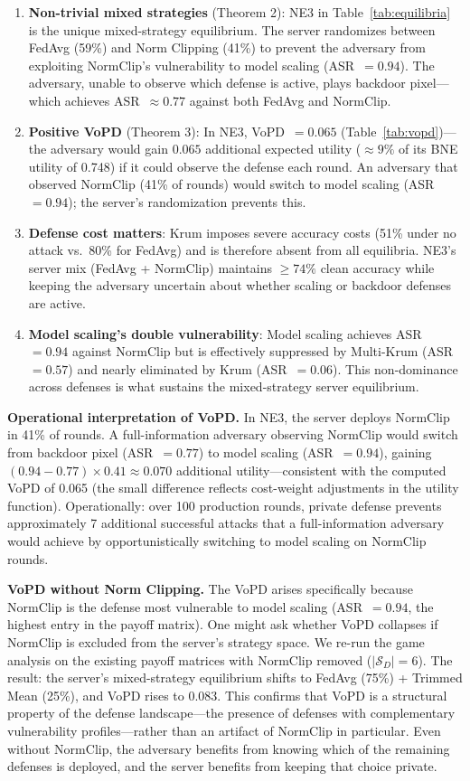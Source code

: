 \documentclass{article}
\newcommand{\SD}{\mathcal{S}_D}
\begin{document}
\begin{enumerate}
    \item \textbf{Non-trivial mixed strategies} (Theorem 2): NE3 in Table~\ref{tab:equilibria} is the unique mixed-strategy equilibrium. The server randomizes between FedAvg (59\%) and Norm Clipping (41\%) to prevent the adversary from exploiting NormClip's vulnerability to model scaling (ASR~$= 0.94$). The adversary, unable to observe which defense is active, plays backdoor pixel---which achieves ASR~$\approx 0.77$ against both FedAvg and NormClip.
    \item \textbf{Positive VoPD} (Theorem 3): In NE3, VoPD~$= 0.065$ (Table~\ref{tab:vopd})---the adversary would gain $0.065$ additional expected utility (${\approx}9\%$ of its BNE utility of 0.748) if it could observe the defense each round. An adversary that observed NormClip (41\% of rounds) would switch to model scaling (ASR~$= 0.94$); the server's randomization prevents this.
    \item \textbf{Defense cost matters}: Krum imposes severe accuracy costs (51\% under no attack vs.\ 80\% for FedAvg) and is therefore absent from all equilibria. NE3's server mix (FedAvg + NormClip) maintains ${\geq}74\%$ clean accuracy while keeping the adversary uncertain about whether scaling or backdoor defenses are active.
    \item \textbf{Model scaling's double vulnerability}: Model scaling achieves ASR~$= 0.94$ against NormClip but is effectively suppressed by Multi-Krum (ASR~$= 0.57$) and nearly eliminated by Krum (ASR~$= 0.06$). This non-dominance across defenses is what sustains the mixed-strategy server equilibrium.
\end{enumerate}

\textbf{Operational interpretation of VoPD.} In NE3, the server deploys NormClip in 41\% of rounds. A full-information adversary observing NormClip would switch from backdoor pixel (ASR~$= 0.77$) to model scaling (ASR~$= 0.94$), gaining $(0.94 - 0.77) \times 0.41 \approx 0.070$ additional utility---consistent with the computed VoPD of 0.065 (the small difference reflects cost-weight adjustments in the utility function). Operationally: over 100 production rounds, private defense prevents approximately 7 additional successful attacks that a full-information adversary would achieve by opportunistically switching to model scaling on NormClip rounds.

\textbf{VoPD without Norm Clipping.} The VoPD arises specifically because NormClip is the defense most vulnerable to model scaling (ASR~$= 0.94$, the highest entry in the payoff matrix). One might ask whether VoPD collapses if NormClip is excluded from the server's strategy space. We re-run the game analysis on the existing payoff matrices with NormClip removed ($|\SD| = 6$). The result: the server's mixed-strategy equilibrium shifts to FedAvg (75\%) + Trimmed Mean (25\%), and VoPD rises to 0.083. This confirms that VoPD is a structural property of the defense landscape---the presence of defenses with complementary vulnerability profiles---rather than an artifact of NormClip in particular. Even without NormClip, the adversary benefits from knowing which of the remaining defenses is deployed, and the server benefits from keeping that choice private.
\end{document}
